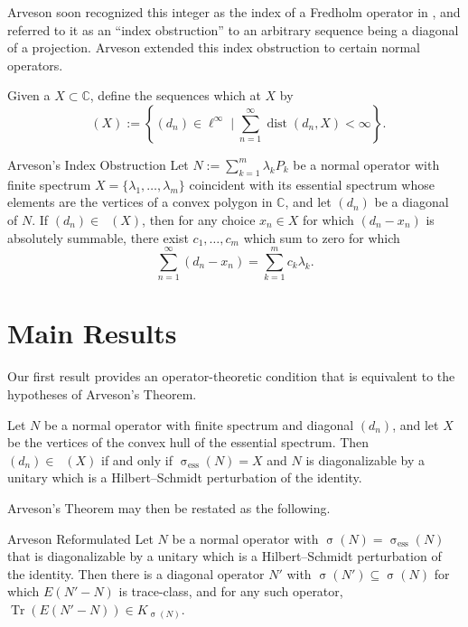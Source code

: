 \documentclass{article}
\DeclareMathOperator{\dist}{dist}
\DeclareMathOperator{\Lim}{Lim^1}
\DeclareMathOperator{\trace}{Tr}
\DeclareMathOperator{\spec}{\sigma}
\newcommand{\essspec}{\spec_{\mathrm{ess}}}
\begin{document}
Arveson soon recognized this integer as the index of a Fredholm operator in \cite{Arv-2007-PNASU}, and referred to it as an ``index obstruction'' to an arbitrary sequence being a diagonal of a projection.
Arveson extended this index obstruction to certain normal operators.

\begin{definition}
  Given a $X \subset \mathbb{C}$, define the sequences which  at $X$ by
  \begin{equation*}
    \Lim (X) := \left\{ (d_n) \in \ell^{\infty} \mid \sum_{n=1}^{\infty} \dist(d_n,X) < \infty \right\}.
  \end{equation*}
\end{definition}

\begin{thmcustom}{Arveson's Index Obstruction}
  Let $N := \sum_{k=1}^m \lambda_k P_k$ be a normal operator with finite spectrum $X = \{\lambda_1,\ldots,\lambda_m\}$ coincident with its essential spectrum whose elements are the vertices of a convex polygon in $\mathbb{C}$, and let $(d_n)$ be a diagonal of $N$.
  If $(d_n) \in \Lim (X)$, then for any choice $x_n \in X$ for which $(d_n-x_n)$ is absolutely summable, there exist  $c_1,\ldots,c_m$ which sum to zero for which
  \begin{equation*}
    \sum_{n=1}^{\infty} (d_n-x_n) = \sum_{k=1}^m c_k \lambda_k.
  \end{equation*}
\end{thmcustom}


\section*{Main Results}

Our first result provides an operator-theoretic condition that is equivalent to the hypotheses of Arveson's Theorem.

\begin{theorem}
  Let $N$ be a normal operator with finite spectrum and diagonal $(d_n)$, and let $X$ be the vertices of the convex hull of the essential spectrum.
  Then $(d_n) \in \Lim(X)$ if and only if $\essspec(N) = X$ and $N$ is diagonalizable by a unitary which is a Hilbert--Schmidt perturbation of the identity.
\end{theorem}

Arveson's Theorem may then be restated as the following.

\begin{thmcustom}{Arveson Reformulated}
  Let $N$ be a normal operator with $\spec(N) = \essspec(N)$ that is diagonalizable by a unitary which is a Hilbert--Schmidt perturbation of the identity.
  Then there is a diagonal operator $N'$ with $\spec(N') \subseteq \spec(N)$ for which $E(N'-N)$ is trace-class, and for any such operator, $\trace(E(N'-N)) \in K_{\spec(N)}$.
\end{thmcustom}
\end{document}

